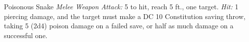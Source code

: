 \documentclass[10pt,a4paper,twoside,bg=print,twocolumn,openany,nodeprecatedcode]{dndbook}
\begin{document}
\begin{DndMonster}[float=t]{Poisonous Snake}
\DndMonsterBasics[
armor-class = {13},
hit-points = {\DndDice{1d4}},
speed = {30 ft., swim 30 ft.}
]
\DndMonsterAbilityScores[
 str = 2,
 dex = 16,
 con = 11,
 int = 1,
 wis = 10,
 cha = 3
]
\DndMonsterDetails[
senses = {blindsight 10 ft., passive perception 10},
challenge = 1/8,
]
\textsl{Melee Weapon Attack:} 5 to hit, reach 5 ft., one target. \textsl{Hit:} 1 piercing damage, and the target must make a DC 10 Constitution saving throw, taking 5 (2d4) poison damage on a failed save, or half as much damage on a successful one.

\end{DndMonster}
\end{document}
